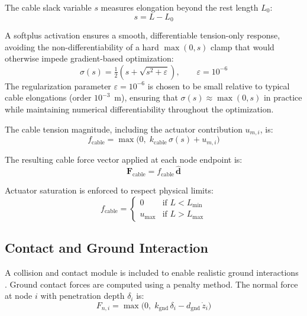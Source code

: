 \documentclass[conference]{IEEEtran}
\begin{document}
The cable slack variable $s$ measures elongation beyond the rest length $L_0$:
%
\begin{equation}
\label{eq:slack}
s = L - L_0
\end{equation}

A softplus activation ensures a smooth, differentiable tension-only response,
avoiding the non-differentiability of a hard $\max(0,s)$ clamp that would
otherwise impede gradient-based optimization:
%
\begin{equation}
\label{eq:softplus}
\sigma(s) = \tfrac{1}{2}\!\left(s + \sqrt{s^2 + \varepsilon}\right),
\qquad \varepsilon = 10^{-6}
\end{equation}
%
The regularization parameter $\varepsilon = 10^{-6}$ is chosen to be small
relative to typical cable elongations (order $10^{-3}$~m), ensuring that
$\sigma(s) \approx \max(0,s)$ in practice while maintaining numerical
differentiability throughout the optimization.

The cable tension magnitude, including the actuator contribution $u_{m,i}$, is:
%
\begin{equation}
\label{eq:cable_mag}
f_{\mathrm{cable}} = \max\!\bigl(0,\;
k_{\mathrm{cable}}\,\sigma(s) + u_{m,i}\bigr)
\end{equation}

The resulting cable force vector applied at each node endpoint is:
%
\begin{equation}
\label{eq:cable_force}
\mathbf{F}_{\mathrm{cable}} = f_{\mathrm{cable}}\,\hat{\mathbf{d}}
\end{equation}

Actuator saturation is enforced to respect physical limits:
%
\begin{equation}
\label{eq:cable_sat}
f_{\mathrm{cable}} =
\begin{cases}
0       & \text{if } L < L_{\min} \\[4pt]
u_{\max} & \text{if } L > L_{\max}
\end{cases}
\end{equation}

\subsection{Contact and Ground Interaction}

A collision and contact module is included to enable realistic ground
interactions \cite{b15}. Ground contact forces are computed using a penalty
method. The normal force at node $i$ with penetration depth $\delta_i$ is:
%
\begin{equation}
\label{eq:contact_normal}
F_{n,i} = \max\!\bigl(0,\; k_{\mathrm{gnd}}\,\delta_i
          - d_{\mathrm{gnd}}\,\dot{z}_i\bigr)
\end{equation}
\end{document}
